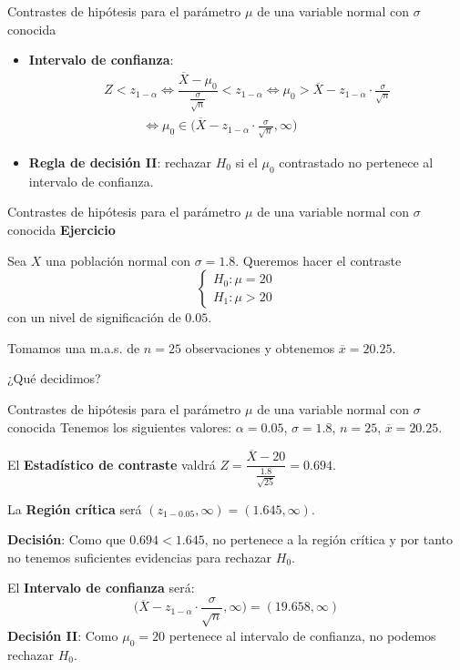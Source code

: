 \documentclass[
  ignorenonframetext,
]{beamer}
\begin{document}
\begin{frame}{Contrastes de hipótesis para el parámetro \(\mu\) de una
variable normal con \(\sigma\) conocida}
\protect\hypertarget{contrastes-de-hipuxf3tesis-para-el-paruxe1metro-mu-de-una-variable-normal-con-sigma-conocida-6}{}
\begin{itemize}[<+->]
\item
  \textbf{Intervalo de confianza}: \[
  \begin{array}{l}
  Z< z_{1-\alpha}\Longleftrightarrow \dfrac{\overline{X}-\mu_0}{\frac{\sigma}{\sqrt{n}}}< z_{1-\alpha} 
  \Longleftrightarrow \mu_0> \overline{X}-z_{1-\alpha}\cdot\frac{\sigma}{\sqrt{n}}\\
  \qquad\quad\Longleftrightarrow \mu_0\in {\Big(\overline{X}-z_{1-\alpha}\cdot\frac{\sigma}{\sqrt{n}},\infty\Big)}
  \end{array}
  \]
\item
  \textbf{Regla de decisión II}: rechazar \(H_0\) si el \(\mu_0\)
  contrastado no pertenece al intervalo de confianza.
\end{itemize}
\end{frame}

\begin{frame}{Contrastes de hipótesis para el parámetro \(\mu\) de una
variable normal con \(\sigma\) conocida}
\protect\hypertarget{contrastes-de-hipuxf3tesis-para-el-paruxe1metro-mu-de-una-variable-normal-con-sigma-conocida-7}{}
\textbf{Ejercicio}

Sea \(X\) una población normal con \(\sigma=1.8\). Queremos hacer el
contraste \[
\left\{\begin{array}{l}
H_0:\mu=20\\ H_1:\mu>20
\end{array}
\right.
\] con un nivel de significación de \(0.05\).

Tomamos una m.a.s. de \(n=25\) observaciones y obtenemos
\(\overline{x}=20.25\).

¿Qué decidimos?
\end{frame}

\begin{frame}{Contrastes de hipótesis para el parámetro \(\mu\) de una
variable normal con \(\sigma\) conocida}
\protect\hypertarget{contrastes-de-hipuxf3tesis-para-el-paruxe1metro-mu-de-una-variable-normal-con-sigma-conocida-8}{}
Tenemos los siguientes valores: \(\alpha=0.05\), \(\sigma=1.8\),
\(n=25\), \(\overline{x}=20.25\).

El \textbf{Estadístico de contraste} valdrá
\(Z=\dfrac{\overline{X}-20}{\frac{1.8}{\sqrt{25}}}=0.694.\)

La \textbf{Región crítica} será \((z_{1-0.05},\infty)=(1.645,\infty)\).

\textbf{Decisión}: Como que \(0.694<1.645\), no pertenece a la región
crítica y por tanto no tenemos suficientes evidencias para rechazar
\(H_0\).

El \textbf{Intervalo de confianza} será: \[
\Big(\overline{X}-z_{1-\alpha}\cdot\frac{\sigma}{\sqrt{n}},\infty\Big)=(19.658,\infty)
\] \textbf{Decisión II}: Como \(\mu_0=20\) pertenece al intervalo de
confianza, no podemos rechazar \(H_0\).
\end{frame}
\end{document}
